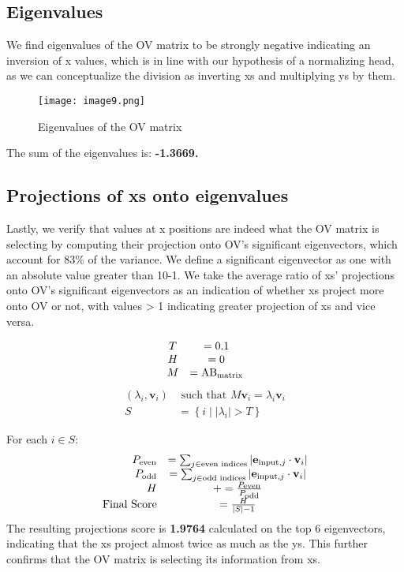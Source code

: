 \documentclass{article}
\begin{document}
\subsection{Eigenvalues}
We find eigenvalues of the OV matrix to be strongly negative indicating an inversion of x values, which is in line with our hypothesis of a normalizing head, as we can conceptualize the division as inverting xs and multiplying ys by them.

\begin{figure}[htbp]
\centering
\texttt{[image: image9.png]}
\caption{Eigenvalues of the OV matrix}
\end{figure}
The sum of the eigenvalues is: \textbf{-1.3669.}

\subsection{Projections of xs onto eigenvalues}
Lastly, we verify that values at x positions are indeed what the OV matrix is selecting by computing their projection onto OV’s significant eigenvectors, which account for 83\% of the variance. We define a significant eigenvector as one with an absolute value greater than 10-1. We take the average ratio of xs’ projections onto OV’s significant eigenvectors as an indication of whether xs project more onto OV or not, with values > 1 indicating greater projection of xs and vice versa.

$$
\begin{array}{cc}
T & =0.1 \\
H & =0 \\
M & =\mathrm{AB}_{\mbox{\scriptsize matrix}}
\end{array}
$$
$$
\begin{array}{rc}
\left(\lambda_i, \mathbf{v}_i\right) & \mbox{ such that } M \mathbf{v}_i=\lambda_i \mathbf{v}_i \\
S & =\left\{i \mid |\lambda_i| >T\right\}
\end{array}
$$

For each $i \in S$:
$$
\begin{array}{rc}
P_{\mbox{\scriptsize even}} & =\sum_{j \in \mbox{\scriptsize even indices}}\left|\mathbf{e}_{\mbox{\scriptsize input}, j} \cdot \mathbf{v}_i\right| \\
P_{\mbox{\scriptsize odd}} & =\sum_{j \in \mbox{\scriptsize odd indices}}\left|\mathbf{e}_{\mbox{\scriptsize input}, j} \cdot \mathbf{v}_i\right| \\
H & +=\frac{P_{\mbox{\scriptsize even}}}{P_{\mbox{\scriptsize odd}}} \\
\mbox{Final Score} & =\frac{H}{|S|-1}
\end{array}
$$
The resulting projections score is \textbf{1.9764} calculated on the top 6 eigenvectors, indicating that the xs project almost twice as much as the ys. This further confirms that the OV matrix is selecting its information from xs.
\end{document}
